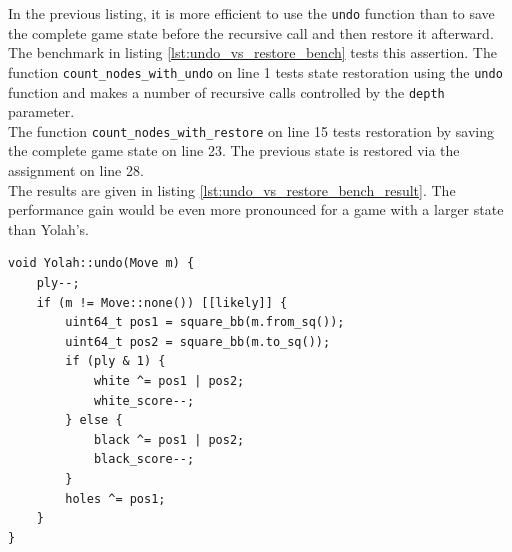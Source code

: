 \documentclass[12pt,a4paper,twoside,openright]{book}
\begin{document}
In the previous listing, it is more efficient to use the \texttt{undo} function than to save the complete game state before the recursive call and then restore it afterward. The benchmark in listing \ref{lst:undo_vs_restore_bench} tests this assertion. The function \texttt{count_nodes_with_undo} on line 1 tests state restoration using the \texttt{undo} function and makes a number of recursive calls controlled by the \texttt{depth} parameter.\\
The function \texttt{count_nodes_with_restore} on line 15 tests restoration by saving the complete game state on line 23. The previous state is restored via the assignment on line 28.\\
The results are given in listing \ref{lst:undo_vs_restore_bench_result}. The performance gain would be even more pronounced for a game with a larger state than Yolah's.

\begin{mdframed}[skipabove=\baselineskip,hidealllines=true]
\begin{verbatim}
void Yolah::undo(Move m) {
    ply--;
    if (m != Move::none()) [[likely]] {                    
        uint64_t pos1 = square_bb(m.from_sq());
        uint64_t pos2 = square_bb(m.to_sq());
        if (ply & 1) {
            white ^= pos1 | pos2;
            white_score--;
        } else {
            black ^= pos1 | pos2;
            black_score--;
        }
        holes ^= pos1;
    }
}
\end{verbatim}
\label{lst:unmaking_moves}
\end{mdframed}
\end{document}
